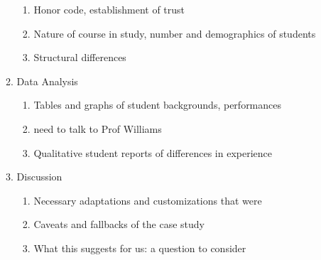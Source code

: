 \begin{enumerate}
\begin{enumerate}
      \begin{enumerate}
        \item Honor code, establishment of trust
        \item Nature of course in study, number and demographics of students
        \item Structural differences
      \end{enumerate}
      \item Data Analysis
      \begin{enumerate}
        \item Tables and graphs of student backgrounds, performances
        \item need to talk to Prof Williams
        \item Qualitative student reports of differences in experience
      \end{enumerate}
      \item Discussion
      \begin{enumerate}
        \item Necessary adaptations and customizations that were
        \item Caveats and fallbacks of the case study
        \item What this suggests for us: a question to consider
      \end{enumerate}
    \end{enumerate}
\end{enumerate}
